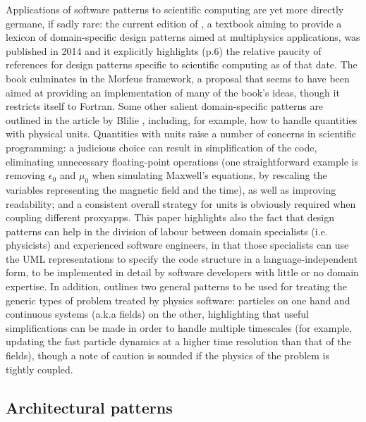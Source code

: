 Applications of software patterns to scientific computing are yet more
directly germane, if sadly rare: the current edition of \cite{rousonxiaxu}, a
textbook aiming to provide a lexicon of domain-specific design patterns aimed
at multiphysics applications, was published in 2014 and it explicitly
highlights (p.6) the relative paucity of references for design patterns
specific to scientific computing as of that date.
The book culminates in the Morfeus framework, a proposal that seems to have
been aimed at providing an implementation of many of the book's ideas, though
it restricts itself to Fortran.
Some other salient domain-specific patterns are outlined in the article by
Blilie \cite{Bl02Patt}, including, for example, how to handle quantities
with physical units.
Quantities with units raise a number of concerns in scientific programming: a
judicious choice can result in simplification of the code, eliminating
unnecessary floating-point operations (one straightforward example is
removing $\epsilon_0$ and $\mu_0$ when simulating Maxwell's equations, by
rescaling the variables representing the magnetic field and the time), as
well as improving readability; and a consistent overall strategy for units is
obviously required when coupling different proxyapps.
This paper highlights also the fact that design patterns can help in the
division of labour between domain specialists (i.e. physicists) and experienced
software engineers, in that those specialists can use the UML representations
to specify the code structure in a language-independent form, to be
implemented in detail by software developers with little or no domain
expertise.
In addition, \cite{Bl02Patt} outlines two general patterns to be used for
treating the generic types of problem treated by physics software: particles
on one hand and continuous systems (a.k.a fields) on the other, highlighting
that useful simplifications can be made in order to handle multiple timescales
(for example, updating the fast particle dynamics at a higher time resolution
than that of the fields), though a note of caution is sounded if the physics
of the problem is tightly coupled.

\subsection{Architectural patterns}


